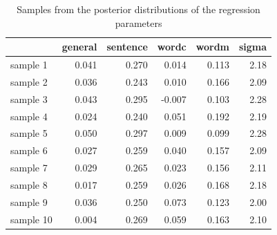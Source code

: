 \documentclass[11pt,a4paper,twoside]{book}
\newenvironment{knitrout}{}{} %
\begin{document}
\begin{knitrout}
\color{fgcolor}\begin{table}

\caption{\label{tab:empirical.data.postsample2}Samples from the posterior distributions of the regression parameters}
\centering
\begin{tabular}[t]{lrrrrr}
\toprule
  & general & sentence & wordc & wordm & sigma\\
\midrule
sample 1 & 0.041 & 0.270 & 0.014 & 0.113 & 2.18\\
sample 2 & 0.036 & 0.243 & 0.010 & 0.166 & 2.09\\
sample 3 & 0.043 & 0.295 & -0.007 & 0.103 & 2.28\\
sample 4 & 0.024 & 0.240 & 0.051 & 0.192 & 2.19\\
sample 5 & 0.050 & 0.297 & 0.009 & 0.099 & 2.28\\
sample 6 & 0.027 & 0.259 & 0.040 & 0.157 & 2.09\\
sample 7 & 0.029 & 0.265 & 0.023 & 0.156 & 2.11\\
sample 8 & 0.017 & 0.259 & 0.026 & 0.168 & 2.18\\
sample 9 & 0.036 & 0.250 & 0.073 & 0.123 & 2.00\\
sample 10 & 0.004 & 0.269 & 0.059 & 0.163 & 2.10\\
\bottomrule
\end{tabular}
\end{table}


\end{knitrout}
\end{document}
